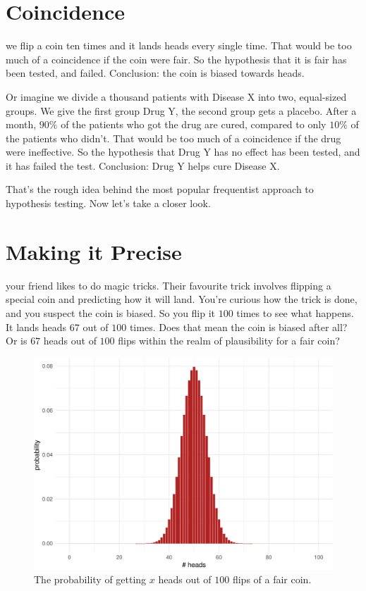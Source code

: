 \documentclass[justified]{tufte-book}
\theoremstyle{definition}
\theoremstyle{definition}
\theoremstyle{definition}
\theoremstyle{remark}
\begin{document}
\hypertarget{coincidence}{%
\section{Coincidence}\label{coincidence}}

 we flip a coin ten times and it lands heads every single time. That would be too much of a coincidence if the coin were fair. So the hypothesis that it is fair has been tested, and failed. Conclusion: the coin is biased towards heads.

Or imagine we divide a thousand patients with Disease X into two, equal-sized groups. We give the first group Drug Y, the second group gets a placebo. After a month, \(90\%\) of the patients who got the drug are cured, compared to only \(10\%\) of the patients who didn't. That would be too much of a coincidence if the drug were ineffective. So the hypothesis that Drug Y has no effect has been tested, and it has failed the test. Conclusion: Drug Y helps cure Disease X.

That's the rough idea behind the most popular frequentist approach to hypothesis testing. Now let's take a closer look.

\hypertarget{making-it-precise}{%
\section{Making it Precise}\label{making-it-precise}}

 your friend likes to do magic tricks. Their favourite trick involves flipping a special coin and predicting how it will land. You're curious how the trick is done, and you suspect the coin is biased. So you flip it \(100\) times to see what happens. It lands heads \(67\) out of \(100\) times. Does that mean the coin is biased after all? Or is \(67\) heads out of \(100\) flips within the realm of plausibility for a fair coin?

\begin{figure}
\includegraphics{_main_files/figure-latex/binom100-1} \caption[The probability of getting $x$ heads out of $100$ flips of a fair coin]{The probability of getting $x$ heads out of $100$ flips of a fair coin.}\label{fig:binom100}
\end{figure}
\end{document}
